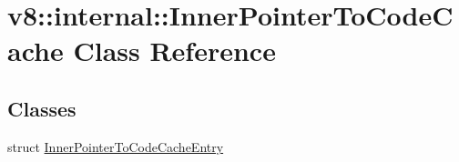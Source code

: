 \hypertarget{classv8_1_1internal_1_1_inner_pointer_to_code_cache}{}\section{v8\+:\+:internal\+:\+:Inner\+Pointer\+To\+Code\+Cache Class Reference}
\label{classv8_1_1internal_1_1_inner_pointer_to_code_cache}
\subsection*{Classes}
\begin{DoxyCompactItemize}
\item 
struct \hyperlink{structv8_1_1internal_1_1_inner_pointer_to_code_cache_1_1_inner_pointer_to_code_cache_entry}{Inner\+Pointer\+To\+Code\+Cache\+Entry}
\end{DoxyCompactItemize}
